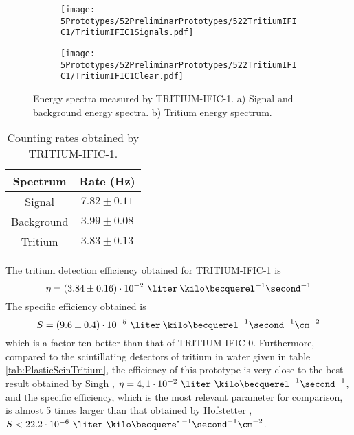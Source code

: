 \begin{figure}
\centering
    \begin{subfigure}[b]{1\textwidth}
    \centering
    \texttt{[image: 5Prototypes/52PreliminarPrototypes/522TritiumIFIC1/TritiumIFIC1Signals.pdf]}  
    \caption{\label{subfig:SignalBackgroundEnergySpectraTritiumIFIC1}}
    \end{subfigure}
    \hfill
    \begin{subfigure}[b]{1\textwidth}
    \centering
    \texttt{[image: 5Prototypes/52PreliminarPrototypes/522TritiumIFIC1/TritiumIFIC1Clear.pdf]}  
    \caption{\label{subfig:TritiumEnergySpectraTritiumIFIC1}}
    \end{subfigure}
 \caption{Energy spectra measured by TRITIUM-IFIC-1. a) Signal and background energy spectra. b) Tritium energy spectrum.}
 \label{fig:EnergySpectraTRITIUMIFIC1}
\end{figure}

\begin{table}[htbp]
\centering{}%
\begin{tabular}{cc}
\toprule 
Spectrum & Rate (Hz) \tabularnewline
\midrule
\midrule 
Signal & $7.82 \pm 0.11$ \tabularnewline
Background & $3.99 \pm 0.08$ \tabularnewline  
Tritium & $3.83 \pm 0.13$ \tabularnewline
\bottomrule
\end{tabular}
\caption{Counting rates obtained by TRITIUM-IFIC-1.}
\label{tab:CountsPerSecondTRITIUMIFIC1}
\end{table}
The tritium detection efficiency obtained for TRITIUM-IFIC-1 is 
$$\eta=(3.84 \pm 0.16)\cdot{} 10^{-2}~\liter\:\kilo\becquerel^{-1}\second^{-1}$$
The specific efficiency obtained is
$$S=(9.6 \pm 0.4)\cdot{} 10^{-5}~\liter\:\kilo\becquerel^{-1}\second^{-1}\cm^{-2}$$
which is a factor ten better than that of TRITIUM-IFIC-0. Furthermore, compared to the scintillating detectors of tritium in water given in table \ref{tab:PlasticScinTritium}, the efficiency of this prototype is very close to the best result obtained by Singh \cite{Ratnakaran, Ratnakaran2000}, $\eta=4,1 \cdot{} 10^{-2}~\liter\ \kilo\becquerel^{-1}\second^{-1}$, and the specific efficiency, which is the most relevant parameter for comparison, is almost 5 times larger than that obtained by Hofstetter \cite{Hofstetter1, Hofstetter2}, $S<22.2 \cdot{} 10^{-6}~\liter\ \kilo\becquerel^{-1}\second^{-1}\cm^{-2}$.
